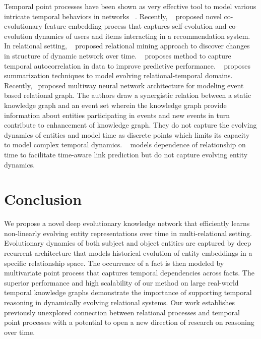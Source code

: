 \documentclass{article}
\begin{document}
Temporal point processes have been shown as very effective tool to model various intricate temporal behaviors in networks ~\citep{YanZha13,FarDuGomValZhaSon14,FarWanGomLietal15, DuWanHeetal15, DuDaiTriUpaGomSon16, WanDuTriSon16,  WanTheVerSon16,WanXieDuSon16, WanWilTheSon17, WanYeZhaSon17}. Recently, ~\citep{WanDuTriSon16,DaiWanTriSon16} proposed novel co-evolutionary feature embedding process that captures self-evolution and co-evolution dynamics of users and items interacting in a recommendation system. In relational setting,  
~\citep{LogCecMal15} proposed relational mining approach to discover changes in structure of dynamic network over time. ~\citep{LogMal17} proposes method to capture temporal autocorrelation in data to improve predictive performance.
~\citep{ShaNev08} proposes summarization techniques to model evolving relational-temporal domains. 
Recently,~\citep{EstTreYanBaiSteKro16} proposed multiway neural network architecture for modeling event based relational graph. The authors draw a synergistic relation between a static knowledge graph and an event set wherein the knowledge graph provide information about entities participating in events and new events in turn contribute to enhancement of knowledge graph. They do not capture the evolving dynamics of entities and model time as discrete points which limits its capacity to model complex temporal dynamics. ~\citep{JiaLiuGeLeiLiChaSui16}  models dependence of relationship on time to facilitate time-aware link prediction but do not capture evolving entity dynamics.

\vspace{-0.2cm}
\section{Conclusion}

We propose a novel deep evolutionary knowledge network that efficiently learns non-linearly evolving entity representations over time in multi-relational setting. Evolutionary dynamics of both subject and object entities are captured by deep recurrent architecture that models historical evolution of entity embeddings in a specific relationship space. The occurrence of a fact is then modeled by multivariate point process that captures temporal dependencies across facts. The superior performance and high scalability of our method on large real-world temporal knowledge graphs demonstrate the importance of supporting temporal reasoning in dynamically evolving relational systems.  Our work establishes previously unexplored connection between relational processes and temporal point processes with a potential to open a new direction of research on reasoning over time.
\end{document}
